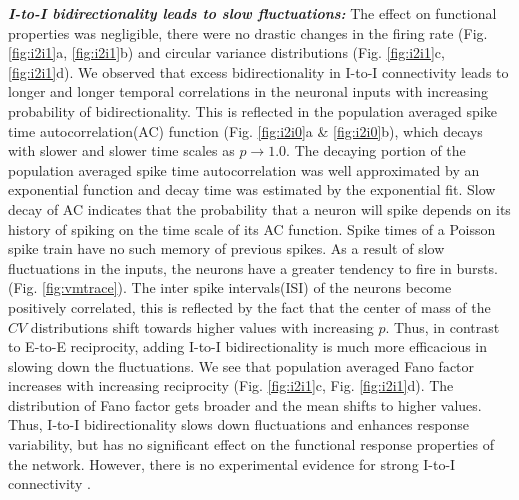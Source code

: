 \emph{\textbf{I-to-I bidirectionality leads to slow fluctuations:}} The effect on functional properties was negligible, there were no drastic changes in the firing rate (Fig. \ref{fig:i2i1}a, \ref{fig:i2i1}b) and circular variance distributions (Fig. \ref{fig:i2i1}c, \ref{fig:i2i1}d). 
We observed that excess bidirectionality in I-to-I connectivity leads to longer and longer temporal correlations in the neuronal inputs with increasing probability of bidirectionality. This is reflected in the population averaged spike time autocorrelation(AC) function (Fig. \ref{fig:i2i0}a \& \ref{fig:i2i0}b), which decays with slower and slower time scales as $p \rightarrow 1.0$. The decaying portion of the population averaged spike time autocorrelation was well approximated by an exponential function and decay time was estimated by the exponential fit. Slow decay of AC indicates that the probability that a neuron will spike depends on its history of spiking on the time scale of its AC function. Spike times of a Poisson spike train have no such memory of previous spikes. As a result of slow fluctuations in the inputs, the neurons have a greater tendency to fire in bursts.(Fig. \ref{fig:vmtrace}). The inter spike intervals(ISI) of the neurons become positively correlated, this is reflected by the fact that the center of mass of the $CV$ distributions shift towards higher values with increasing $p$. Thus, in contrast to E-to-E reciprocity, adding I-to-I bidirectionality is much more efficacious in slowing down the fluctuations. 
We see that population averaged Fano factor increases with increasing reciprocity (Fig. \ref{fig:i2i1}c, Fig. \ref{fig:i2i1}d). The distribution of Fano factor  gets broader and the mean shifts to higher values. Thus, I-to-I bidirectionality slows down fluctuations and enhances response variability, but has no significant effect on the functional response properties of the network. However, there is no experimental evidence for strong I-to-I connectivity \cite{Avermann2012}.\\

